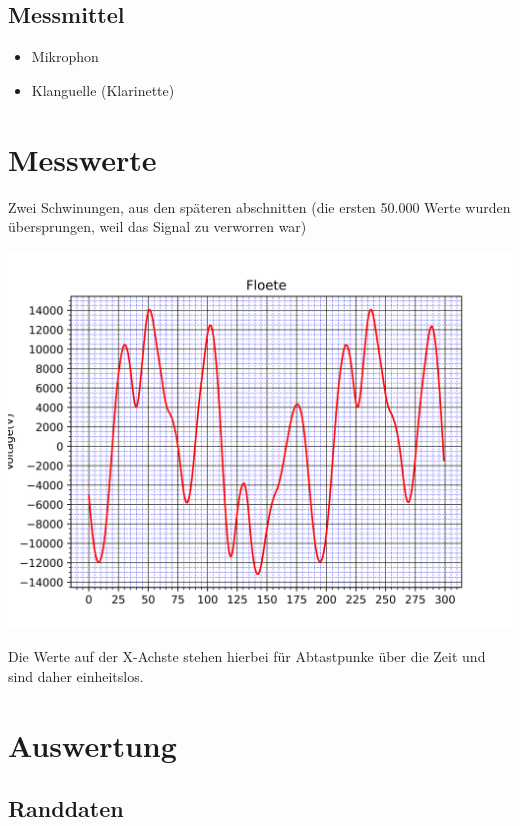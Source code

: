 \subsection*{Messmittel}
\begin{itemize}
	\item Mikrophon
	\item Klanguelle (Klarinette)
\end{itemize}

\section{Messwerte}
\label{chap:VERSUCH_1_MESSWERTE}

Zwei Schwinungen, aus den späteren abschnitten (die ersten 50.000 Werte wurden übersprungen, weil das Signal zu verworren war)

\includegraphics[scale=0.07]{media/Signal_Raster.png}
\label{fig: Signal}

Die Werte auf der X-Achste stehen hierbei für Abtastpunke über die Zeit und sind daher einheitslos.

\section{Auswertung}
\label{chap:VERSUCH_1_AUSWERTUNG}

\subsection*{Randdaten}

